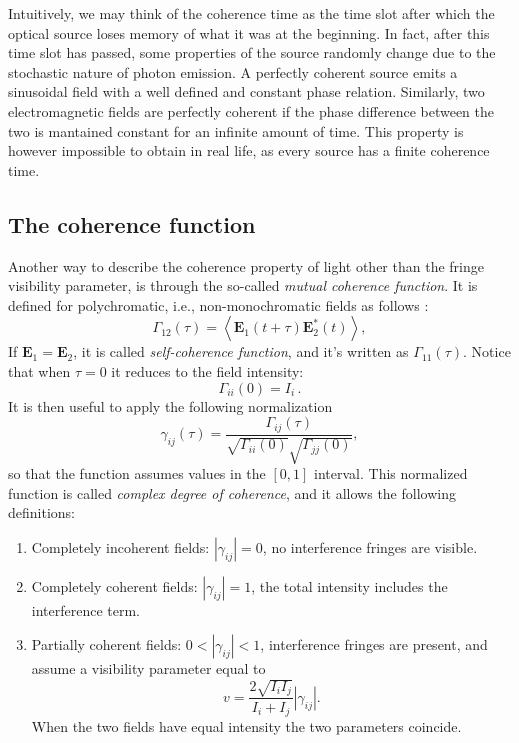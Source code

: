 Intuitively, we may think of the coherence time as the time slot after which the optical source loses memory of what it was at the beginning. In fact, after this time slot has passed, some properties of the source randomly change due to the stochastic nature of photon emission. A perfectly coherent source emits a sinusoidal field with a well defined and constant phase relation. Similarly, two electromagnetic fields are perfectly coherent if the phase difference between the two is mantained constant for an infinite amount of time. This property is however impossible to obtain in real life, as every source has a finite coherence time.
\subsection{The coherence function}
Another way to describe the coherence property of light other than the fringe visibility parameter, is through the so-called \emph{mutual coherence function}. It is defined for polychromatic, i.e., non-monochromatic fields as follows \cite{Wolf1999}:
\begin{equation}\label{eq:mutual-coherence}
	\Gamma_{12}(\tau) = \left\langle  \mathbf{E}_1(t+\tau)\mathbf{E}_2^*(t)   \right\rangle,
\end{equation}
If $\mathbf{E}_1 = \mathbf{E}_2$, it is called \emph{self-coherence function}, and it's written as $\Gamma_{11}(\tau)$. Notice that when $\tau = 0$ it reduces to the field intensity:
\begin{equation}
	\Gamma_{ii}(0) = I_i\,.
\end{equation}
It is then useful to apply the following normalization
\begin{equation}
	\gamma_{ij} (\tau) = \frac{\Gamma_{ij}(\tau)}{\sqrt{\Gamma_{ii}(0)}\sqrt{\Gamma_{jj}(0)}},
\end{equation}
so that the function assumes values in the $[0,1]$ interval. This normalized function is called \emph{complex degree of coherence}, and it allows the following definitions:
\begin{enumerate}
	\item Completely incoherent fields: $|\gamma_{ij}| = 0$, no interference fringes are visible.
	\item Completely coherent fields: $|\gamma_{ij}| = 1$, the total intensity includes the interference term. 
	\item Partially coherent fields: $0 < |\gamma_{ij}| < 1$, interference fringes are present, and assume a visibility parameter equal to 
	\begin{equation}
		v = \frac{2\sqrt{I_i I_j}}{I_i + I_j}|\gamma_{ij}|.
	\end{equation}
	When the two fields have equal intensity the two parameters coincide.
\end{enumerate}

